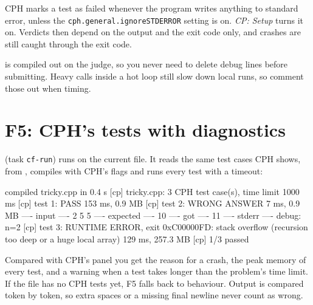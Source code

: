 \begin{fact}
CPH marks a test as failed whenever the program writes anything to standard error, unless the
\texttt{cph.general.ignoreSTDERROR} setting is on. \emph{CP: Setup} turns it on. Verdicts then depend on the output and
the exit code only, and crashes are still caught through the exit code.
\end{fact}

\begin{tip}
 is compiled out on the judge, so you never need to delete debug lines before submitting. Heavy 
calls inside a hot loop still slow down local runs, so comment those out when timing.
\end{tip}

\section{F5: CPH's tests with diagnostics}\label{sec:f5}

 (task \texttt{cf-run}) runs  on the current file. It reads the same test cases CPH
shows, from , compiles with CPH's flags and
runs every test with a timeout:

\begin{shell}
[cp] compiled tricky.cpp in 0.4 s
[cp] tricky.cpp: 3 CPH test case(s), time limit 1000 ms
[cp] test 1: PASS  153 ms, 0.9 MB
[cp] test 2: WRONG ANSWER  7 ms, 0.9 MB
---- input ----
2
5 5
---- expected ----
10
---- got ----
11
---- stderr ----
debug: n=2
[cp] test 3: RUNTIME ERROR, exit 0xC00000FD: stack overflow (recursion too deep or a huge local array)  129 ms, 257.3 MB
[cp] 1/3 passed
\end{shell}

Compared with CPH's panel you get the reason for a crash, the peak memory of every test, and a warning when a
test takes longer than the problem's time limit. If the file has no CPH tests yet, F5 falls back to
 behaviour. Output is compared token by token, so extra spaces or a missing final newline never count
as wrong.

